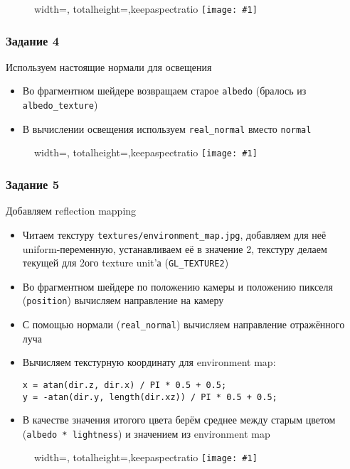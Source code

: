 \documentclass{beamer}
\newcommand{\slideimage}[1]{
  \begin{figure}
    \begin{adjustbox}{width=\textwidth, totalheight=\textheight-2\baselineskip-2\baselineskip,keepaspectratio}
      \texttt{[image: \#1]}
    \end{adjustbox}
  \end{figure}
}
\begin{document}
\begin{frame}[fragile]
\slideimage{3.png}
\end{frame}

\begin{frame}[fragile]
\frametitle{Задание 4}
Используем настоящие нормали для освещения
\begin{itemize}
\item Во фрагментном шейдере возвращаем старое \verb|albedo| (бралось из \verb|albedo_texture|)
\item В вычислении освещения используем \verb|real_normal| вместо \verb|normal|
\end{itemize}
\end{frame}

\begin{frame}[fragile]
\slideimage{4.png}
\end{frame}

\begin{frame}[fragile]
\frametitle{Задание 5}
Добавляем reflection mapping
\begin{itemize}
\item Читаем текстуру \verb|textures/environment_map.jpg|, добавляем для неё uniform-переменную, устанавливаем её в значение 2, текстуру делаем текущей для 2ого texture unit'а (\verb|GL_TEXTURE2|)
\item Во фрагментном шейдере по положению камеры и положению пикселя (\verb|position|) вычисляем направление на камеру
\item С помощью нормали (\verb|real_normal|) вычисляем направление отражённого луча
\item Вычисляем текстурную координату для environment map:
\begin{verbatim}
x = atan(dir.z, dir.x) / PI * 0.5 + 0.5;
y = -atan(dir.y, length(dir.xz)) / PI * 0.5 + 0.5;
\end{verbatim}
\item В качестве значения итогого цвета берём среднее между старым цветом (\verb|albedo * lightness|) и значением из environment map
\end{itemize}
\end{frame}

\begin{frame}[fragile]
\slideimage{5.png}
\end{frame}
\end{document}
